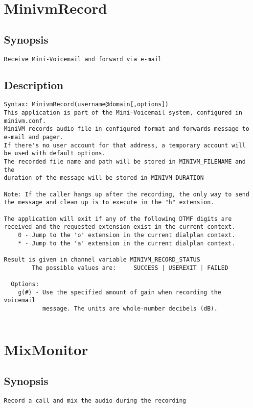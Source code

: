 \section{MinivmRecord}
\subsection{Synopsis}
\begin{verbatim}
Receive Mini-Voicemail and forward via e-mail
\end{verbatim}
\subsection{Description}
\begin{verbatim}
Syntax: MinivmRecord(username@domain[,options])
This application is part of the Mini-Voicemail system, configured in minivm.conf.
MiniVM records audio file in configured format and forwards message to e-mail and pager.
If there's no user account for that address, a temporary account will
be used with default options.
The recorded file name and path will be stored in MINIVM_FILENAME and the 
duration of the message will be stored in MINIVM_DURATION

Note: If the caller hangs up after the recording, the only way to send
the message and clean up is to execute in the "h" extension.

The application will exit if any of the following DTMF digits are 
received and the requested extension exist in the current context.
    0 - Jump to the 'o' extension in the current dialplan context.
    * - Jump to the 'a' extension in the current dialplan context.

Result is given in channel variable MINIVM_RECORD_STATUS
        The possible values are:     SUCCESS | USEREXIT | FAILED

  Options:
    g(#) - Use the specified amount of gain when recording the voicemail
           message. The units are whole-number decibels (dB).


\end{verbatim}


\section{MixMonitor}
\subsection{Synopsis}
\begin{verbatim}
Record a call and mix the audio during the recording
\end{verbatim}
